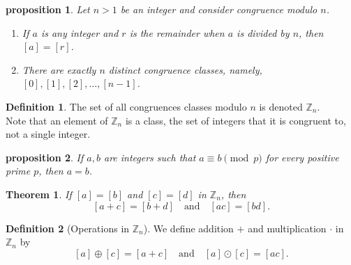 \documentclass{article}
\newtheorem{theorem}{Theorem}[section]
\newtheorem{proposition}{Proposition}[section]
\newtheorem{proposition}{proposition}[section]
\theoremstyle{definition}
\newtheorem{definition}{Definition}[section]
\theoremstyle{remark}
\begin{document}
\begin{proposition}
Let $n > 1$ be an integer and consider congruence modulo $n$.
\begin{enumerate}
\item If $a$ is any integer and $r$ is the remainder when $a$ is divided by $n$, then $[a] = [r]$.
\item There are exactly $n$ distinct congruence classes, namely, $[0], [1], [2], \dots, [n - 1]$.
\end{enumerate}
\end{proposition}



\begin{definition}
The set of all congruences classes modulo $n$ is denoted $\mathbb{Z}_n$.\\
Note that an element of $\mathbb{Z}_n$ is a class, the set of integers that it is congruent to, not a single integer. 
\end{definition}

\begin{proposition}
If $a, b$ are integers such that $a \equiv b \pmod{p}$ for every positive prime $p$, then $a = b$.
\end{proposition}



\begin{theorem}
If $[a] = [b]$ and $[c] = [d]$ in $\mathbb{Z}_n$, then
\[
[a + c] = [b + d] \quad \text{and} \quad [ac] = [bd].
\]
\end{theorem}



\begin{definition}[Operations in $\mathbb{Z}_n$]
We define addition $+$ and multiplication $ \cdot$ in $\mathbb{Z}_n$ by 
\[
[a] \oplus [c] = [a + c] \quad \text{and} \quad [a] \odot [c] = [ac].
\]
\end{definition}
\end{document}
